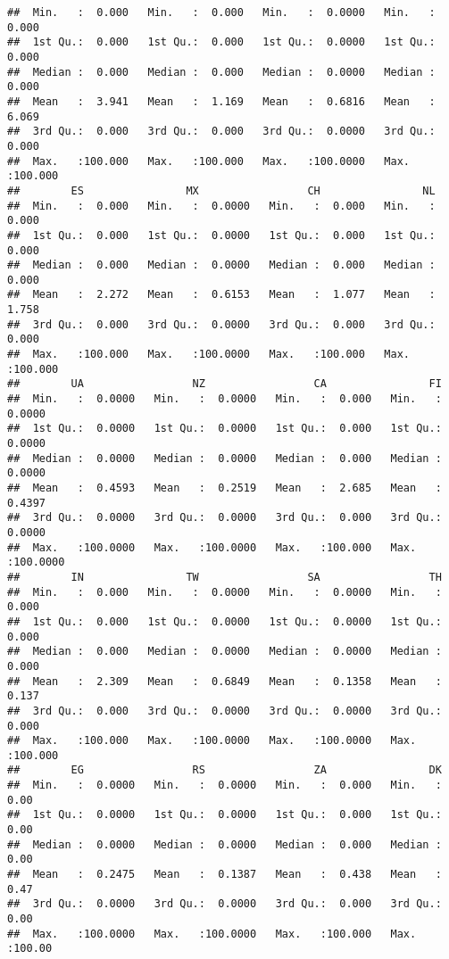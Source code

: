 \documentclass[
]{article}
\begin{document}
\begin{verbatim}
##  Min.   :  0.000   Min.   :  0.000   Min.   :  0.0000   Min.   :  0.000  
##  1st Qu.:  0.000   1st Qu.:  0.000   1st Qu.:  0.0000   1st Qu.:  0.000  
##  Median :  0.000   Median :  0.000   Median :  0.0000   Median :  0.000  
##  Mean   :  3.941   Mean   :  1.169   Mean   :  0.6816   Mean   :  6.069  
##  3rd Qu.:  0.000   3rd Qu.:  0.000   3rd Qu.:  0.0000   3rd Qu.:  0.000  
##  Max.   :100.000   Max.   :100.000   Max.   :100.0000   Max.   :100.000  
##        ES                MX                 CH                NL         
##  Min.   :  0.000   Min.   :  0.0000   Min.   :  0.000   Min.   :  0.000  
##  1st Qu.:  0.000   1st Qu.:  0.0000   1st Qu.:  0.000   1st Qu.:  0.000  
##  Median :  0.000   Median :  0.0000   Median :  0.000   Median :  0.000  
##  Mean   :  2.272   Mean   :  0.6153   Mean   :  1.077   Mean   :  1.758  
##  3rd Qu.:  0.000   3rd Qu.:  0.0000   3rd Qu.:  0.000   3rd Qu.:  0.000  
##  Max.   :100.000   Max.   :100.0000   Max.   :100.000   Max.   :100.000  
##        UA                 NZ                 CA                FI          
##  Min.   :  0.0000   Min.   :  0.0000   Min.   :  0.000   Min.   :  0.0000  
##  1st Qu.:  0.0000   1st Qu.:  0.0000   1st Qu.:  0.000   1st Qu.:  0.0000  
##  Median :  0.0000   Median :  0.0000   Median :  0.000   Median :  0.0000  
##  Mean   :  0.4593   Mean   :  0.2519   Mean   :  2.685   Mean   :  0.4397  
##  3rd Qu.:  0.0000   3rd Qu.:  0.0000   3rd Qu.:  0.000   3rd Qu.:  0.0000  
##  Max.   :100.0000   Max.   :100.0000   Max.   :100.000   Max.   :100.0000  
##        IN                TW                 SA                 TH         
##  Min.   :  0.000   Min.   :  0.0000   Min.   :  0.0000   Min.   :  0.000  
##  1st Qu.:  0.000   1st Qu.:  0.0000   1st Qu.:  0.0000   1st Qu.:  0.000  
##  Median :  0.000   Median :  0.0000   Median :  0.0000   Median :  0.000  
##  Mean   :  2.309   Mean   :  0.6849   Mean   :  0.1358   Mean   :  0.137  
##  3rd Qu.:  0.000   3rd Qu.:  0.0000   3rd Qu.:  0.0000   3rd Qu.:  0.000  
##  Max.   :100.000   Max.   :100.0000   Max.   :100.0000   Max.   :100.000  
##        EG                 RS                 ZA                DK        
##  Min.   :  0.0000   Min.   :  0.0000   Min.   :  0.000   Min.   :  0.00  
##  1st Qu.:  0.0000   1st Qu.:  0.0000   1st Qu.:  0.000   1st Qu.:  0.00  
##  Median :  0.0000   Median :  0.0000   Median :  0.000   Median :  0.00  
##  Mean   :  0.2475   Mean   :  0.1387   Mean   :  0.438   Mean   :  0.47  
##  3rd Qu.:  0.0000   3rd Qu.:  0.0000   3rd Qu.:  0.000   3rd Qu.:  0.00  
##  Max.   :100.0000   Max.   :100.0000   Max.   :100.000   Max.   :100.00  

\end{verbatim}
\end{document}
